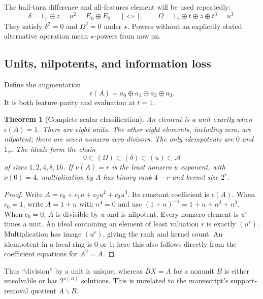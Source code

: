 \documentclass[11pt,a4paper]{article}
\newtheorem{theorem}{Theorem}[section]
\theoremstyle{definition}\newtheorem{definition}[theorem]{Definition}
\theoremstyle{remark}\newtheorem{remark}[theorem]{Remark}
\newcommand{\alg}{\mathcal A}
\newcommand{\one}{1_{\phi}}
\numberwithin{equation}{section}
\begin{document}
The half-turn difference and all-features element will be used repeatedly:
\begin{equation}\label{eq:specials}
 \delta=\one\oplus z=u^2=E_0\oplus E_2=[\Leftrightarrow],\qquad
 \Omega=\one\oplus t\oplus z\oplus t^3=u^3.
\end{equation}
They satisfy $\delta^2=0$ and $\Omega^2=0$ under $\star$. Powers without an explicitly stated alternative operation mean $\star$-powers from now on.

\subsection{Units, nilpotents, and information loss}
Define the augmentation
\begin{equation}
 \epsilon(A)=a_0\oplus a_1\oplus a_2\oplus a_3.
\end{equation}
It is both feature parity and evaluation at $t=1$.
\begin{theorem}[Complete scalar classification]\label{thm:classification}
An element is a unit exactly when $\epsilon(A)=1$. There are eight units. The other eight elements, including zero, are nilpotent; there are seven nonzero zero divisors. The only idempotents are $0$ and $\one$.
The ideals form the chain
\begin{equation}\label{eq:ideals}
 0\subset(\Omega)\subset(\delta)\subset(u)\subset\alg
\end{equation}
of sizes $1,2,4,8,16$. If $\nu(A)=r$ is the least nonzero $u$ exponent, with $\nu(0)=4$, multiplication by $A$ has binary rank $4-r$ and kernel size $2^r$.
\end{theorem}
\begin{proof}
Write $A=c_0+c_1u+c_2u^2+c_3u^3$. Its constant coefficient is $\epsilon(A)$. When $c_0=1$, write $A=1+n$ with $n^4=0$ and use $(1+n)^{-1}=1+n+n^2+n^3$. When $c_0=0$, $A$ is divisible by $u$ and is nilpotent. Every nonzero element is $u^r$ times a unit. An ideal containing an element of least valuation $r$ is exactly $(u^r)$. Multiplication has image $(u^r)$, giving the rank and kernel count. An idempotent in a local ring is 0 or 1; here this also follows directly from the coefficient equations for $A^2=A$.
\end{proof}
Thus ``division'' by a unit is unique, whereas $BX=A$ for a nonunit $B$ is either unsolvable or has $2^{\nu(B)}$ solutions. This is unrelated to the manuscript's support-removal quotient $A\backslash B$.
\end{document}
